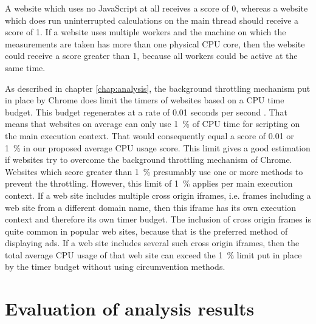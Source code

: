 \documentclass[
	ruledheaders=section,%
	class=report,%
	thesis={type=bachelor},%
	accentcolor=9c,%
	custommargins=true,%
	marginpar=false,%
	parskip=half-,%
	fontsize=11pt,%
]{tudapub}
\begin{document}
  A website which uses no JavaScript at all receives a score of 0, whereas a website which does run uninterrupted calculations on the main thread should receive a score of 1. If a website uses multiple workers and the machine on which the measurements are taken has more than one physical CPU core, then the website could receive a score greater than 1, because all workers could be active at the same time.

  As described in chapter \ref{chap:analysis}, the background throttling mechanism put in place by Chrome does limit the timers of websites based on a CPU time budget. This budget regenerates at a rate of 0.01 seconds per second \cite{chrome-background-tabs}. That means that websites on average can only use 1~\% of CPU time for scripting on the main execution context. That would consequently equal a score of 0.01 or 1~\% in our proposed average CPU usage score. This limit gives a good estimation if websites try to overcome the background throttling mechanism of Chrome. Websites which score greater than 1~\% presumably use one or more methods to prevent the throttling. However, this limit of 1~\% applies per main execution context. If a web site includes multiple cross origin iframes, i.e. frames including a web site from a different domain name, then this iframe has its own execution context and therefore its own timer budget. The inclusion of cross origin frames is quite common in popular web sites, because that is the preferred method of displaying ads. If a web site includes several such cross origin iframes, then the total average CPU usage of that web site can exceed the 1~\% limit put in place by the timer budget without using circumvention methods.

  
  \section{Evaluation of analysis results}
\end{document}
